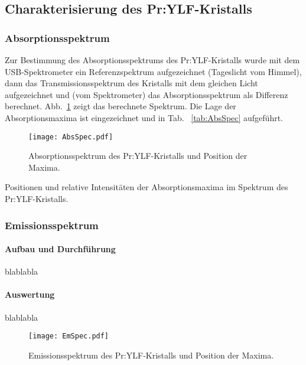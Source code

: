 \subsection{Charakterisierung des Pr:YLF-Kristalls}

\subsubsection{Absorptionsspektrum}

Zur Bestimmung des Absorptionsspektrums des Pr:YLF-Kristalls wurde mit dem USB-Spektrometer ein
Referenzspektrum aufgezeichnet (Tageslicht vom Himmel), dann das Transmissionsspektrum des Kristalls
mit dem gleichen Licht aufgezeichnet und (vom Spektrometer) das Absorptionsspektrum als Differenz
berechnet.
Abb.~\ref{img:AbsSpec} zeigt das berechnete Spektrum.
Die Lage der Absorptionsmaxima ist eingezeichnet und in Tab.~ \ref{tab:AbsSpec} aufgeführt.

\begin{figure}[H]
\begin{center}
  \texttt{[image: AbsSpec.pdf]}
  \caption{Absorptionsspektrum des Pr:YLF-Kristalls und Position der Maxima.}
  \label{img:AbsSpec}
\end{center}
\end{figure}

\begin{table}[htb]
\caption{Positionen und relative Intensitäten der Absorptionsmaxima im Spektrum des
Pr:YLF-Kristalls.}

\label{tab:AbsSpec}
\end{table}


\subsubsection{Emissionsspektrum}

\paragraph{Aufbau und Durchführung}
blablabla

\paragraph{Auswertung}

blablabla

\begin{figure}[H]
\begin{center}
  \texttt{[image: EmSpec.pdf]}
  \caption{Emissionsspektrum des Pr:YLF-Kristalls und Position der Maxima.}
  \label{img:EmSpec}
\end{center}
\end{figure}

